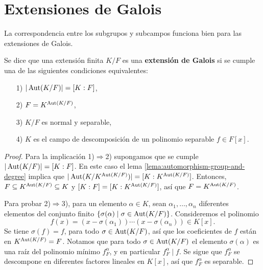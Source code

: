 
\section{Extensiones de Galois}

La correspondencia entre los subgrupos y subcampos funciona bien para las
extensiones de Galois.

\begin{proposicion-definicion}
  Se dice que una extensión finita $K/F$ es una \textbf{extensión de Galois}
  si se cumple una de las siguientes condiciones equivalentes:
  \begin{enumerate}
  \item[1)] $|\operatorname{Aut} (K/F)| = [K : F]$,

  \item[2)] $F = K^{\operatorname{Aut} (K/F)}$,

  \item[3)] $K/F$ es normal y separable,

  \item[4)] $K$ es el campo de descomposición de un polinomio separable
    $f \in F[x]$.
  \end{enumerate}

  \begin{proof}
    Para la implicación 1)$\Rightarrow$2) supongamos que se cumple
    $|\operatorname{Aut} (K/F)| = [K : F]$. En este caso el lema
    \ref{lema:automorphism-group-and-degree} implica que
    $|\operatorname{Aut} (K/K^{\operatorname{Aut} (K/F)})| = [K : K^{\operatorname{Aut} (K/F)}]$. Entonces,
    $F \subseteq K^{\operatorname{Aut} (K/F)} \subseteq K$ y $[K : F] = [K : K^{\operatorname{Aut} (K/F)}]$,
    así que $F = K^{\operatorname{Aut} (K/F)}$.


    \vspace{1em}

    Para probar 2)$\Rightarrow$3), para un elemento $\alpha \in K$,
    sean $\alpha_1, \ldots, \alpha_n$ diferentes elementos del conjunto finito
    $\{ \sigma (\alpha) \mid \sigma \in \operatorname{Aut} (K/F) \}$.
    Consideremos el polinomio
    $$f(x) = (x - \sigma (\alpha_1))\cdots (x - \sigma (\alpha_n)) \in K[x].$$
    Se tiene $\sigma (f) = f$, para todo $\sigma \in \operatorname{Aut} (K/F)$, así que los
    coeficientes de $f$ están en $K^{\operatorname{Aut} (K/F)} = F$. Notamos que para todo
    $\sigma \in \operatorname{Aut} (K/F)$ el elemento $\sigma (\alpha)$ es una raíz del
    polinomio mínimo $f^\alpha_F$, y en particular $f^\alpha_F \mid f$. Se sigue
    que $f^\alpha_F$ se descompone en diferentes factores lineales en
    $K [x]$, así que $f^\alpha_F$ es separable.


\end{proof}
\end{proposicion-definicion}
